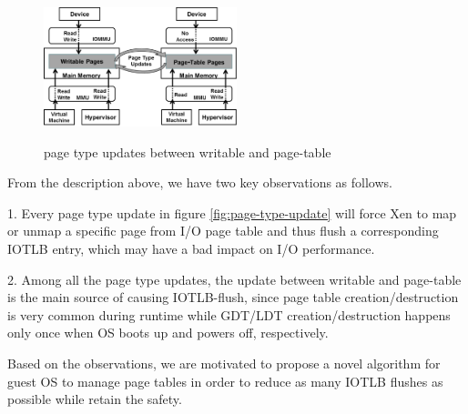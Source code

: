 \begin{figure}[ht]
\centering
\includegraphics[width=0.5\textwidth]{image/background/wr2pt.png} \\
\caption{page type updates between writable and page-table}
\label{fig:wr2pt}
\end{figure}

From the description above, we have two key observations as follows.

1. Every page type update in figure \ref{fig:page-type-update} will force Xen to map or unmap a specific page from I/O page table and thus flush a corresponding IOTLB entry, which may have a bad impact on I/O performance.

2. Among all the page type updates, the update between writable and page-table is the main source of causing IOTLB-flush, since page table creation/destruction is very common during runtime while GDT/LDT creation/destruction happens only once when OS boots up and powers off, respectively.

Based on the observations, we are motivated to propose a novel algorithm for guest OS to manage page tables in order to reduce as many IOTLB flushes as possible while retain the safety.
